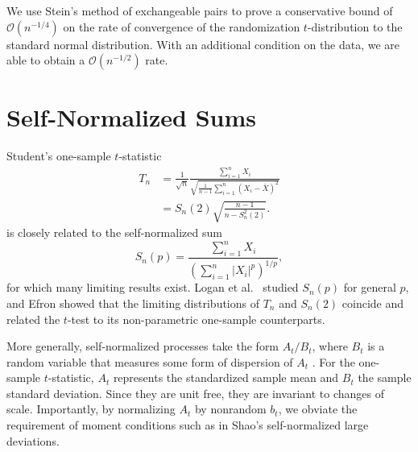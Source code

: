 We use Stein's method of exchangeable pairs to prove a conservative
bound of $\mathcal{O}(n^{-1/4})$ on the rate of convergence of the randomization
$t$-distribution to the standard normal distribution.  With an
additional condition on the data, we are able to obtain a
$\mathcal{O}(n^{-1/2})$ rate.

\section{Self-Normalized Sums}
Student's one-sample $t$-statistic
\begin{align*}
  T_n &= \frac{1}{\sqrt{n}} \frac{\sum_{i=1}^n X_i}{\sqrt{\frac{1}{n-1} \sum_{i=1}^n(X_i - \bar{X})^2}} \\
  &= S_n(2) \sqrt{\frac{n-1}{n-S_n^2(2)}}.
\end{align*}
is closely related to the self-normalized sum
\begin{equation*}
  S_n(p) = \frac{\sum_{i=1}^n X_i}{\left ( \sum_{i=1}^n|X_i|^p \right )^{1/p}},
\end{equation*}
for which many limiting results exist.  Logan et al.\
\cite{logan1973limit} studied $S_n(p)$ for general $p$, and
Efron \cite{efron1969student} showed that the limiting distributions of
$T_n$ and $S_n(2)$ coincide and related the $t$-test to its
non-parametric one-sample counterparts.

More generally, self-normalized processes take the form $A_t/B_t$,
where $B_t$ is a random variable that measures some form of dispersion
of $A_t$ \cite{de2004self}.  For the one-sample $t$-statistic, $A_t$
represents the standardized sample mean and $B_t$ the sample standard
deviation.  Since they are unit free, they are invariant to changes of
scale.  Importantly, by normalizing $A_t$ by nonrandom $b_t$, we
obviate the requirement of moment conditions such as in Shao's \cite{shao1997self}
self-normalized large deviations.




